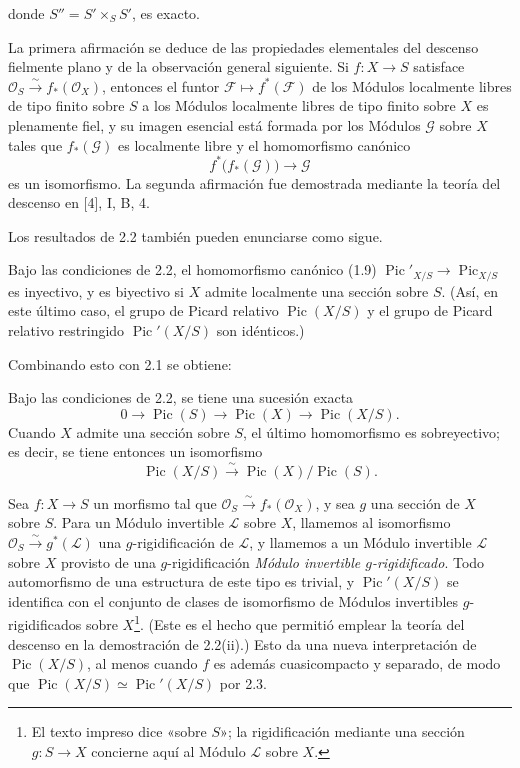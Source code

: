 donde $S''=S'\times_SS'$, es exacto.

La primera afirmación se deduce de las propiedades elementales del descenso
fielmente plano y de la observación general siguiente. Si
$f:X\longrightarrow S$ satisface
$\mathcal O_S\xrightarrow{\sim}f_*(\mathcal O_X)$, entonces el funtor
$\mathcal F\longmapsto f^*(\mathcal F)$ de los Módulos localmente libres de
tipo finito sobre $S$ a los Módulos localmente libres de tipo finito sobre $X$
es plenamente fiel, y su imagen esencial está formada por los Módulos
$\mathcal G$ sobre $X$ tales que $f_*(\mathcal G)$ es localmente libre y el
homomorfismo canónico
\[
f^*\bigl(f_*(\mathcal G)\bigr)\longrightarrow\mathcal G
\]
es un isomorfismo. La segunda afirmación fue demostrada mediante la teoría del
descenso en [4], I, B, 4.

Los resultados de 2.2 también pueden enunciarse como sigue.

 Bajo las condiciones de 2.2, el homomorfismo canónico
(1.9) $\operatorname{Pic}'_{X/S}\longrightarrow\operatorname{Pic}_{X/S}$ es
inyectivo, y es biyectivo si $X$ admite localmente una sección sobre $S$.
(Así, en este último caso, el grupo de Picard relativo
$\operatorname{Pic}(X/S)$ y el grupo de Picard relativo restringido
$\operatorname{Pic}'(X/S)$ son idénticos.)

Combinando esto con 2.1 se obtiene:

 Bajo las condiciones de 2.2, se tiene una sucesión
exacta
\[
0\longrightarrow\operatorname{Pic}(S)\longrightarrow\operatorname{Pic}(X)
\longrightarrow\operatorname{Pic}(X/S).
\]
Cuando $X$ admite una sección sobre $S$, el último homomorfismo es
sobreyectivo; es decir, se tiene entonces un isomorfismo
\[
\operatorname{Pic}(X/S)\xrightarrow{\sim}
\operatorname{Pic}(X)/\operatorname{Pic}(S).
\]

 Sea $f:X\longrightarrow S$ un morfismo tal que
$\mathcal O_S\xrightarrow{\sim}f_*(\mathcal O_X)$, y sea $g$ una sección de
$X$ sobre $S$. Para un Módulo invertible $\mathcal L$ sobre $X$, llamemos al
isomorfismo $\mathcal O_S\xrightarrow{\sim}g^*(\mathcal L)$ una
$g$-rigidificación de $\mathcal L$, y llamemos a un Módulo invertible
$\mathcal L$ sobre $X$ provisto de una $g$-rigidificación \emph{Módulo
invertible $g$-rigidificado}. Todo automorfismo de una estructura de este
tipo es trivial, y $\operatorname{Pic}'(X/S)$ se identifica con el conjunto de
clases de isomorfismo de Módulos invertibles $g$-rigidificados sobre
$X$\footnote{El texto impreso dice «sobre $S$»; la rigidificación mediante una
sección $g:S\to X$ concierne aquí al Módulo $\mathcal L$ sobre $X$.}. (Este es
el hecho que permitió emplear la teoría del descenso en la demostración de
2.2(ii).) Esto da una nueva interpretación de $\operatorname{Pic}(X/S)$, al
menos cuando $f$ es además cuasicompacto y separado, de modo que
$\operatorname{Pic}(X/S)\simeq\operatorname{Pic}'(X/S)$ por 2.3.

